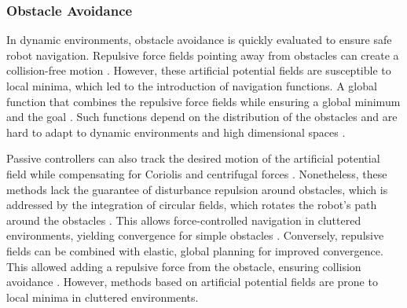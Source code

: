 \subsubsection{Obstacle Avoidance}
In dynamic environments, obstacle avoidance is quickly evaluated to ensure safe robot navigation. Repulsive force fields pointing away from obstacles can create a collision-free motion \parencite{khatib1987unified}. 
However, these artificial potential fields are susceptible to local minima, which led to the introduction of navigation functions. A global function that combines the repulsive force fields while ensuring a global minimum and the goal \parencite{koditschek1990robot}. Such functions depend on the distribution of the obstacles and are hard to adapt to dynamic environments and high dimensional spaces \parencite{loizou2022mobile}.


Passive controllers can also track the desired motion of the artificial potential field while compensating for Coriolis and centrifugal forces \parencite{duindam2004passive}. 
Nonetheless, these methods lack the guarantee of disturbance repulsion around obstacles, which is addressed by the integration of circular fields, which rotates the robot's path around the obstacles \parencite{singh1996real}. 
This allows force-controlled navigation in cluttered environments, yielding convergence for simple obstacles \parencite{haddadin2011dynamic}. 
Conversely, repulsive fields can be combined with elastic, global planning \parencite{brock2002elastic} for improved convergence. This allowed adding a repulsive force from the obstacle, ensuring collision avoidance \parencite{tulbure2020closing}. 
However, methods based on artificial potential fields are prone to local minima in cluttered environments.

